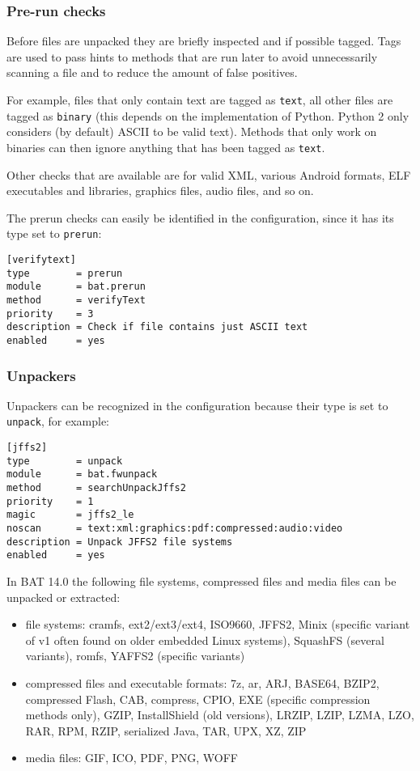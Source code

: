 \documentclass[10pt]{article}
\begin{document}
\subsubsection{Pre-run checks}

Before files are unpacked they are briefly inspected and if possible tagged.
Tags are used to pass hints to methods that are run later to avoid unnecessarily
scanning a file and to reduce the amount of false positives.

For example, files that only contain text are tagged as \texttt{text}, all other
files are tagged as \texttt{binary} (this depends on the implementation of
Python. Python 2 only considers (by default) ASCII to be valid text). Methods
that only work on binaries can then ignore anything that has been tagged as
\texttt{text}.

Other checks that are available are for valid XML, various Android formats,
ELF executables and libraries, graphics files, audio files, and so on.

The prerun checks can easily be identified in the configuration, since it has
its type set to \texttt{prerun}:

\begin{verbatim}
[verifytext]
type        = prerun
module      = bat.prerun
method      = verifyText
priority    = 3
description = Check if file contains just ASCII text
enabled     = yes
\end{verbatim}

\subsubsection{Unpackers}

Unpackers can be recognized in the configuration because their type is set
to \texttt{unpack}, for example:

\begin{verbatim}
[jffs2]
type        = unpack
module      = bat.fwunpack
method      = searchUnpackJffs2
priority    = 1
magic       = jffs2_le
noscan      = text:xml:graphics:pdf:compressed:audio:video
description = Unpack JFFS2 file systems
enabled     = yes
\end{verbatim}

In BAT 14.0 the following file systems, compressed files and media files can be
unpacked or extracted:

\begin{itemize}
\item file systems: cramfs, ext2/ext3/ext4, ISO9660, JFFS2, Minix (specific
variant of v1 often found on older embedded Linux systems), SquashFS (several
variants), romfs, YAFFS2 (specific variants)
\item compressed files and executable formats: 7z, ar, ARJ, BASE64, BZIP2,
compressed Flash, CAB, compress, CPIO, EXE (specific compression methods only),
GZIP, InstallShield (old versions), LRZIP, LZIP, LZMA, LZO, RAR, RPM, RZIP,
serialized Java, TAR, UPX, XZ, ZIP
\item media files: GIF, ICO, PDF, PNG, WOFF
\end{itemize}
\end{document}
